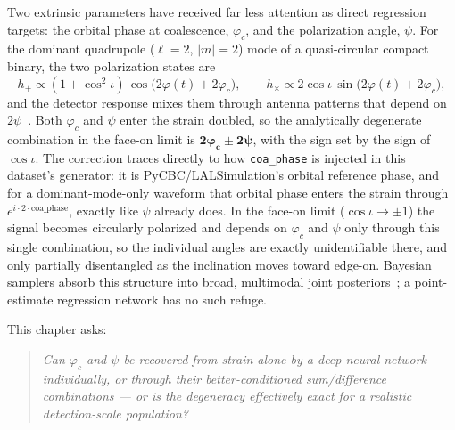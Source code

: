 Two extrinsic parameters have received far less attention as direct regression targets: the orbital phase at coalescence, $\varphi_c$, and the polarization angle, $\psi$.
For the dominant quadrupole ($\ell=2$, $|m|=2$) mode of a quasi-circular compact binary, the two polarization states are
\begin{equation}
    h_+ \propto (1+\cos^2\iota)\,\cos\!\bigl(2\varphi(t)+2\varphi_c\bigr),
    \qquad
    h_\times \propto 2\cos\iota\,\sin\!\bigl(2\varphi(t)+2\varphi_c\bigr),
\end{equation}
and the detector response mixes them through antenna patterns that depend on $2\psi$~\cite{cutler1994gw,sathyaprakash2009physics}.
Both $\varphi_c$ and $\psi$ enter the strain doubled, so the analytically degenerate combination in the face-on limit is $\mathbf{2\varphi_c \pm 2\psi}$, with the sign set by the sign of $\cos\iota$.
The correction traces directly to how \texttt{coa\_phase} is injected in this dataset's generator: it is PyCBC/LALSimulation's orbital reference phase, and for a dominant-mode-only waveform that orbital phase enters the strain through $e^{i\cdot 2\cdot\text{coa\_phase}}$, exactly like $\psi$ already does.
In the face-on limit ($\cos\iota \to \pm 1$) the signal becomes circularly polarized and depends on $\varphi_c$ and $\psi$ only through this single combination, so the individual angles are exactly unidentifiable there, and only partially disentangled as the inclination moves toward edge-on.
Bayesian samplers absorb this structure into broad, multimodal joint posteriors~\cite{veitch2015lalinference}; a point-estimate regression network has no such refuge.

This chapter asks:
\begin{quote}
\itshape Can $\varphi_c$ and $\psi$ be recovered from strain alone by a deep neural network --- individually, or through their better-conditioned sum/difference combinations --- or is the degeneracy effectively exact for a realistic detection-scale population?
\end{quote}

